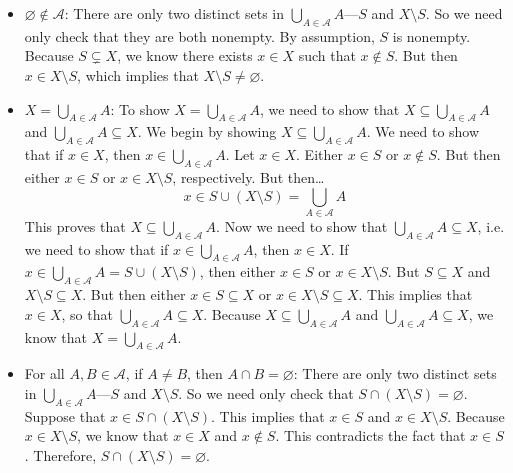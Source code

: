 \documentclass[11pt,letterpaper]{article}
\begin{document}
	\begin{itemize}
	\item $\varnothing \notin \mathcal{A}$: There are only two distinct sets in $\bigcup_{A \in \mathcal{A}} A$---$S$ and $X \setminus S$. So we need only check that they are both nonempty. By assumption, $S$ is nonempty. Because $S \subsetneq X$, we know there exists $x \in X$ such that $x \notin S$. But then $x \in X \setminus S$, which implies that $X \setminus S \neq \varnothing$. \pspace
		
	\item $X= \bigcup_{A \in \mathcal{A}} A$: To show $X= \bigcup_{A \in \mathcal{A}} A$, we need to show that $X \subseteq \bigcup_{A \in \mathcal{A}} A$ and $\bigcup_{A \in \mathcal{A}} A \subseteq X$. We begin by showing $X \subseteq \bigcup_{A \in \mathcal{A}} A$. We need to show that if $x \in X$, then $x \in \bigcup_{A \in \mathcal{A}} A$. Let $x \in X$. Either $x \in S$ or $x \notin S$. But then either $x \in S$ or $x \in X \setminus S$, respectively. But then\dots
		\[
		x \in S \cup (X \setminus S)= \bigcup_{A \in \mathcal{A}} A
		\] 
	This proves that $X \subseteq \bigcup_{A \in \mathcal{A}} A$. Now we need to show that $\bigcup_{A \in \mathcal{A}} A \subseteq X$, i.e. we need to show that if $x \in \bigcup_{A \in \mathcal{A}} A$, then $x \in X$. If $x \in \bigcup_{A \in \mathcal{A}} A= S \cup (X \setminus S)$, then either $x \in S$ or $x \in X \setminus S$. But $S \subseteq X$ and $X \setminus S \subseteq X$. But then either $x \in S \subseteq X$ or $x \in X \setminus S \subseteq X$. This implies that $x \in X$, so that $\bigcup_{A \in \mathcal{A}} A \subseteq X$. Because $X \subseteq \bigcup_{A \in \mathcal{A}} A$ and $\bigcup_{A \in \mathcal{A}} A \subseteq X$, we know that $X= \bigcup_{A \in \mathcal{A}} A$. \pspace
	
	\item For all $A, B \in \mathcal{A}$, if $A \neq B$, then $A \cap B= \varnothing$: There are only two distinct sets in $\bigcup_{A \in \mathcal{A}} A$---$S$ and $X \setminus S$. So we need only check that $S \cap (X \setminus S)= \varnothing$. Suppose that $x \in S \cap (X \setminus S)$. This implies that $x \in S$ and $x \in X \setminus S$. Because $x \in X \setminus S$, we know that $x \in X$ and $x \notin S$. This contradicts the fact that $x \in S$. Therefore, $S \cap (X \setminus S)= \varnothing$. \pspace
	\end{itemize}



\newpage
\end{document}
